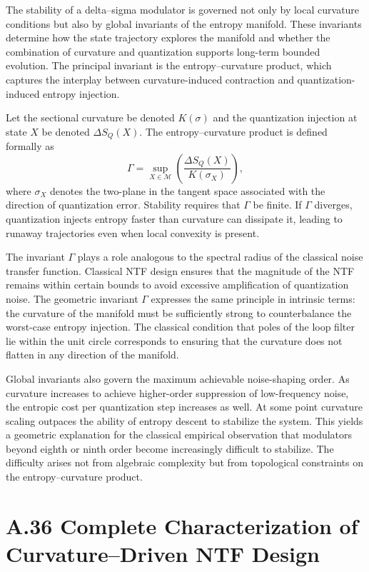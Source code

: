 The stability of a delta–sigma modulator is governed not only by local curvature conditions but also by global invariants of the entropy manifold. These invariants determine how the state trajectory explores the manifold and whether the combination of curvature and quantization supports long-term bounded evolution. The principal invariant is the entropy–curvature product, which captures the interplay between curvature-induced contraction and quantization-induced entropy injection.

Let the sectional curvature be denoted \(K(\sigma)\) and the quantization injection at state \(X\) be denoted \(\Delta S_Q(X)\). The entropy–curvature product is defined formally as
\[
\Gamma = \sup_{X \in \mathcal{M}} \left( \frac{\Delta S_Q(X)}{K(\sigma_X)} \right),
\]
where \(\sigma_X\) denotes the two-plane in the tangent space associated with the direction of quantization error. Stability requires that \(\Gamma\) be finite. If \(\Gamma\) diverges, quantization injects entropy faster than curvature can dissipate it, leading to runaway trajectories even when local convexity is present.

The invariant \(\Gamma\) plays a role analogous to the spectral radius of the classical noise transfer function. Classical NTF design ensures that the magnitude of the NTF remains within certain bounds to avoid excessive amplification of quantization noise. The geometric invariant \(\Gamma\) expresses the same principle in intrinsic terms: the curvature of the manifold must be sufficiently strong to counterbalance the worst-case entropy injection. The classical condition that poles of the loop filter lie within the unit circle corresponds to ensuring that the curvature does not flatten in any direction of the manifold.

Global invariants also govern the maximum achievable noise-shaping order. As curvature increases to achieve higher-order suppression of low-frequency noise, the entropic cost per quantization step increases as well. At some point curvature scaling outpaces the ability of entropy descent to stabilize the system. This yields a geometric explanation for the classical empirical observation that modulators beyond eighth or ninth order become increasingly difficult to stabilize. The difficulty arises not from algebraic complexity but from topological constraints on the entropy–curvature product.

\section{A.36 Complete Characterization of Curvature–Driven NTF Design}

